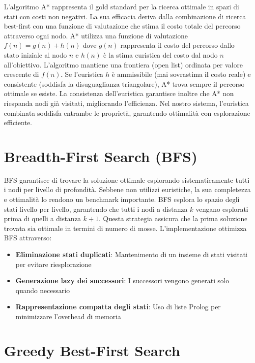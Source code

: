 \documentclass[12pt,a4paper]{report}
\theoremstyle{definition}
\begin{document}
L'algoritmo A* rappresenta il gold standard per la ricerca ottimale in spazi di stati con costi non negativi. La sua efficacia deriva dalla combinazione di ricerca best-first con una funzione di valutazione che stima il costo totale del percorso attraverso ogni nodo. A* utilizza una funzione di valutazione $f(n) = g(n) + h(n)$ dove $g(n)$ rappresenta il costo del percorso dallo stato iniziale al nodo $n$ e $h(n)$ è la stima euristica del costo dal nodo $n$ all'obiettivo. L'algoritmo mantiene una frontiera (open list) ordinata per valore crescente di $f(n)$. Se l'euristica $h$ è ammissibile (mai sovrastima il costo reale) e consistente (soddisfa la disuguaglianza triangolare), A* trova sempre il percorso ottimale se esiste. La consistenza dell'euristica garantisce inoltre che A* non riespanda nodi già visitati, migliorando l'efficienza. Nel nostro sistema, l'euristica combinata soddisfa entrambe le proprietà, garantendo ottimalità con esplorazione efficiente.

\section{Breadth-First Search (BFS)}

BFS garantisce di trovare la soluzione ottimale esplorando sistematicamente tutti i nodi per livello di profondità. Sebbene non utilizzi euristiche, la sua completezza e ottimalità lo rendono un benchmark importante. BFS esplora lo spazio degli stati livello per livello, garantendo che tutti i nodi a distanza $k$ vengano esplorati prima di quelli a distanza $k+1$. Questa strategia assicura che la prima soluzione trovata sia ottimale in termini di numero di mosse. L'implementazione ottimizza BFS attraverso:

\begin{itemize}
    \item \textbf{Eliminazione stati duplicati}: Mantenimento di un insieme di stati visitati per evitare riesplorazione
    \item \textbf{Generazione lazy dei successori}: I successori vengono generati solo quando necessario
    \item \textbf{Rappresentazione compatta degli stati}: Uso di liste Prolog per minimizzare l'overhead di memoria
\end{itemize}

\section{Greedy Best-First Search}
\end{document}
